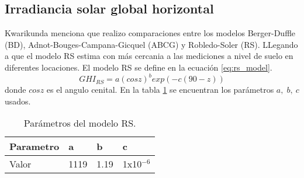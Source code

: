 \subsection{Irradiancia solar global horizontal}
Kwarikunda\cite{Kwarikunda_2021} menciona que realizo comparaciones entre los modelos Berger-Duffle (BD), Adnot-Bouges-Campana-Gicquel (ABCG) y Robledo-Soler (RS). LLegando a que el modelo RS estima con más cercania a las mediciones a nivel de suelo en diferentes locaciones. El modelo RS se define en la ecuación \ref{eq:rs_model}.
\begin{equation}
	GHI_{RS} = a(cos z)^b exp(-c(90-z))
	\label{eq:rs_model}
\end{equation}
donde $cos z$ es el angulo cenital. En la tabla \ref{table:rs_parameters} se encuentran los parámetros $a,\;b,\:c$ usados.
\begin{table}[H]
	\centering
	\begin{tabular}{llll} \hline
		\textbf{Parametro } & \textbf{a} & \textbf{b} & \textbf{c}    \\ \hline
		Valor               & 1119       & 1.19       & 1x10$^{-6  }$ \\ \hline
	\end{tabular}
	\caption{Parámetros del modelo RS.}
	\label{table:rs_parameters}
\end{table}
